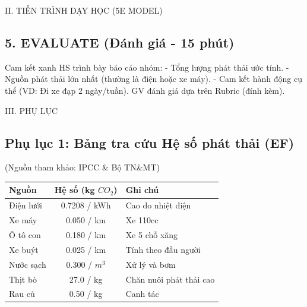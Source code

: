 \documentclass[12pt,a4paper]{article}
\begin{document}
\begin{sectionbox}{II. TIẾN TRÌNH DẠY HỌC (5E MODEL)}
\subsection*{5. EVALUATE (Đánh giá - 15 phút)}
\begin{activitybox}{Cam kết xanh}
HS trình bày báo cáo nhóm:
- Tổng lượng phát thải ước tính.
- Nguồn phát thải lớn nhất (thường là điện hoặc xe máy).
- Cam kết hành động cụ thể (VD: Đi xe đạp 2 ngày/tuần).
GV đánh giá dựa trên Rubric (đính kèm).
\end{activitybox}

\end{sectionbox}

\newpage
\begin{sectionbox}{III. PHỤ LỤC}
\subsection*{Phụ lục 1: Bảng tra cứu Hệ số phát thải (EF)}
(Nguồn tham khảo: IPCC \& Bộ TN\&MT)
\begin{center}
\begin{tabular}{|l|c|l|}
\hline
\rowcolor{primary!20} \textbf{Nguồn} & \textbf{Hệ số (kg $CO_2$)} & \textbf{Ghi chú} \\
\hline
Điện lưới & 0.7208 / kWh & Cao do nhiệt điện \\
Xe máy & 0.050 / km & Xe 110cc \\
Ô tô con & 0.180 / km & Xe 5 chỗ xăng \\
Xe buýt & 0.025 / km & Tính theo đầu người \\
Nước sạch & 0.300 / $m^3$ & Xử lý và bơm \\
Thịt bò & 27.0 / kg & Chăn nuôi phát thải cao \\
Rau củ & 0.50 / kg & Canh tác \\
\hline
\end{tabular}
\end{center}


\end{sectionbox}
\end{document}
